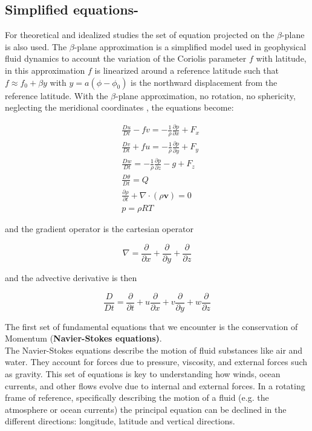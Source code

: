 \subsection{Simplified equations-}\label{summary-of-fundamental-equations}

For theoretical and idealized studies the set of equation projected on the \(\beta\)-plane is also used. The $\beta$-plane approximation is a simplified model used in geophysical fluid dynamics to account the variation of the Coriolis parameter $f$ with latitude, in this approximation $f$ is linearized around a reference latitude such that $f\approx f_0+\beta y$ with $y=a(\phi-\phi_0)$ is the northward displacement from the reference latitude. With the $\beta$-plane approximation, no rotation, no sphericity, neglecting the meridional coordinates , the equations become:

\[\begin{aligned}
		 & \frac{D u}{Dt} - fv  = -\frac{1}{\rho}\frac{\partial p}{\partial x}   + F_x \\
		 & \frac{D v}{Dt} + fu = -\frac{1}{\rho}\frac{\partial p}{\partial y}  + F_y   \\
		 & \frac{D w}{Dt}  = -\frac{1}{\rho }\frac{\partial p}{\partial z} -g  + F_z   \\
		 & \frac{D \theta}{Dt} = Q                                                     \\
		 & \frac{\partial \rho}{\partial t}+\nabla\cdot(\rho\mathbf{v}) = 0            \\
		 & p = \rho R T
	\end{aligned}\]

and the gradient operator is the cartesian operator

\[\nabla = \frac{\partial }{\partial x} + \frac{\partial }{\partial y} + \frac{\partial }{\partial z}\]

and the advective derivative is then

\[\frac{D }{Dt} = \frac{\partial }{\partial t} + u\frac{\partial }{\partial x} + v\frac{\partial }{\partial y} + w\frac{\partial }{\partial z}\]

The first set of fundamental equations that we encounter is the conservation of Momentum (\textbf{Navier-Stokes equations)}.\\
The Navier-Stokes equations describe the motion of fluid substances like air and water. They account for forces due to pressure, viscosity, and external forces such as gravity. This set of equations is key to understanding how winds, ocean currents, and other flows evolve due to internal and external forces. In a rotating frame of reference, specifically describing the motion of a fluid (e.g. the atmosphere or ocean currents) the principal equation can be declined in the different directions: longitude, latitude and vertical directions.

